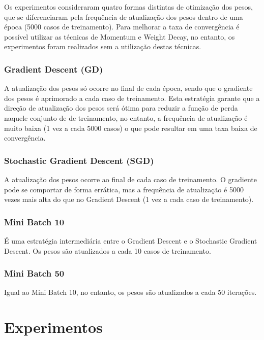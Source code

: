 \documentclass{report}
\begin{document}
Os experimentos consideraram quatro formas distintas de otimização dos pesos, que se diferenciaram pela frequência
de atualização dos pesos dentro de uma época (5000 casos de treinamento). Para melhorar 
a taxa de convergência é possível utilizar as técnicas de Momentum e Weight Decay, no entanto, os experimentos
foram realizados sem a utilização destas técnicas.

\subsection{Gradient Descent (GD)}

A atualização dos pesos só ocorre no final de cada época, sendo que o gradiente dos pesos é aprimorado a cada caso de treinamento. 
Esta estratégia garante que a direção de atualização dos pesos será ótima para reduzir a função de perda naquele conjunto de 
de treinamento, no entanto, a frequência de atualização é muito baixa (1 vez a cada 5000 casos) o que pode resultar em uma taxa
baixa de convergência.

\subsection{Stochastic Gradient Descent (SGD)}

A atualização dos pesos ocorre ao final de cada caso de treinamento. O gradiente pode se comportar de forma errática, mas a frequência
de atualização é 5000 vezes mais alta do que no Gradient Descent (1 vez a cada caso de treinamento).

\subsection{Mini Batch 10}

É uma estratégia intermediária entre o Gradient Descent e o Stochastic Gradient Descent. Os pesos são atualizados a cada 10
casos de treinamento.

\subsection{Mini Batch 50}

Igual ao Mini Batch 10, no entanto, os pesos são atualizados a cada 50 iterações.

\chapter{Experimentos}
\end{document}
